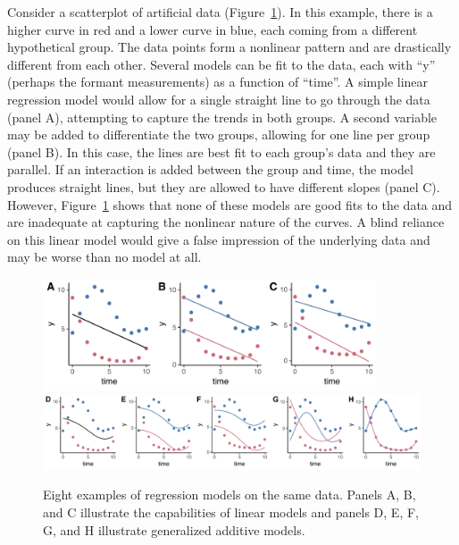 Consider a scatterplot of artificial data (Figure~\ref{fig:illustrative_gamms}). In this example, there is a higher curve in red and a lower curve in blue, each coming from a different hypothetical group. The data points form a nonlinear pattern and are drastically different from each other. Several models can be fit to the data, each with ``y'' (perhaps the formant measurements) as a function of ``time''. A simple linear regression model would allow for a single straight line to go through the data (panel A), attempting to capture the trends in both groups. A second variable may be added to differentiate the two groups, allowing for one line per group (panel B). In this case, the lines are best fit to each group’s data and they are parallel. If an interaction is added between the group and time, the model produces straight lines, but they are allowed to have different slopes (panel C). However, Figure~\ref{fig:illustrative_gamms} shows that none of these models are good fits to the data and are inadequate at capturing the nonlinear nature of the curves. A blind reliance on this linear model would give a false impression of the underlying data and may be worse than no model at all.

\begin{figure}
    \centering
    \includegraphics[width=3.9in, left]{Figures/methods/lm_plots.pdf}
    \includegraphics[width = 6.5in]{Figures/methods/gam_plots.pdf}
    \caption[Eight examples of regression models on the same data.]{Eight examples of regression models on the same data. Panels A, B, and C illustrate the capabilities of linear models and panels D, E, F, G, and H illustrate generalized additive models.}
    \label{fig:illustrative_gamms}
\end{figure}

